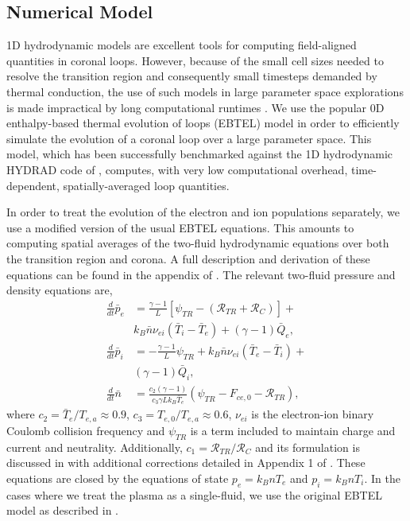 \documentclass[preprint,linenumbers]{aastex}
\begin{document}
	\subsection{Numerical Model}
	\label{subsec:numerics}
	\par 1D hydrodynamic models are excellent tools for computing field-aligned quantities in coronal loops. However, because of the small cell sizes needed to resolve the transition region and consequently small timesteps demanded by thermal conduction, the use of such models in large parameter space explorations is made impractical by long computational runtimes \citep{bradshaw_influence_2013}. We use the popular 0D enthalpy-based thermal evolution of loops (EBTEL) model \citep{klimchuk_highly_2008,cargill_enthalpy-based_2012,cargill_enthalpy-based_2012-1,cargill_modelling_2015} in order to efficiently simulate the evolution of a coronal loop over a large parameter space. This model, which has been successfully benchmarked against the 1D hydrodynamic HYDRAD code of \citet{bradshaw_influence_2013}, computes, with very low computational overhead, time-dependent, spatially-averaged loop quantities.
	\par In order to treat the evolution of the electron and ion populations separately, we use a modified version of the usual EBTEL equations. This amounts to computing spatial averages of the two-fluid hydrodynamic equations over both the transition region and corona. A full description and derivation of these equations can be found in the appendix of . The relevant two-fluid pressure and density equations are,
	\begin{align}
		\frac{d}{dt}\bar{p}_e &= \frac{\gamma - 1}{L}\left\lbrack\psi_{TR} - (\mathcal{R}_{TR} + \mathcal{R}_C)\right\rbrack + \nonumber\\ &k_B\bar{n}\nu_{ei}(\bar{T}_i - \bar{T}_e) + (\gamma - 1)\bar{Q}_e,\label{eq:ebtel2fl_pe}\\
		\frac{d}{dt}\bar{p}_i &= -\frac{\gamma - 1}{L}\psi_{TR} + k_B\bar{n}\nu_{ei}(\bar{T}_e - \bar{T}_i) +\nonumber\\ &(\gamma - 1)\bar{Q}_i,\label{eq:ebtel2fl_pi}\\
		\frac{d}{dt}\bar{n} &= \frac{c_2(\gamma - 1)}{c_3\gamma Lk_B\bar{T}_e}\left(\psi_{TR} - F_{ce,0} - \mathcal{R}_{TR}\right),\label{eq:ebtel2fl_n}
	\end{align}
	where $c_2=\bar{T}_e/T_{e,a}\approx0.9$, $c_3=T_{e,0}/T_{e,a}\approx0.6$, $\nu_{ei}$ is the electron-ion binary Coulomb collision frequency and $\psi_{TR}$ is a term included to maintain charge and current and neutrality. Additionally, $c_1=\mathcal{R}_{TR}/\mathcal{R}_C$ and its formulation is discussed in \citet{cargill_enthalpy-based_2012} with additional corrections detailed in Appendix 1 of . These equations are closed by the equations of state $p_e=k_BnT_e$ and $p_i=k_BnT_i$. In the cases where we treat the plasma as a single-fluid, we use the original EBTEL model as described in \citet{klimchuk_highly_2008,cargill_enthalpy-based_2012}.
\end{document}
